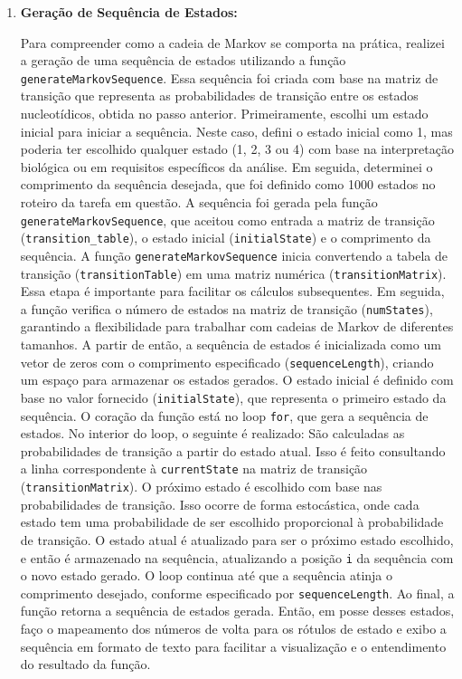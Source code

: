 \documentclass{article}
\begin{document}
\begin{enumerate}
    \item \textbf{Geração de Sequência de Estados:}
    
    Para compreender como a cadeia de Markov se comporta na prática, realizei a geração de uma sequência de estados utilizando a função \texttt{generateMarkovSequence}. Essa sequência foi criada com base na matriz de transição que representa as probabilidades de transição entre os estados nucleotídicos, obtida no passo anterior. Primeiramente, escolhi um estado inicial para iniciar a sequência. Neste caso, defini o estado inicial como 1, mas poderia ter escolhido qualquer estado (1, 2, 3 ou 4) com base na interpretação biológica ou em requisitos específicos da análise. Em seguida, determinei o comprimento da sequência desejada, que foi definido como 1000 estados no roteiro da tarefa em questão. A sequência foi gerada pela função \texttt{generateMarkovSequence}, que aceitou como entrada a matriz de transição (\texttt{transition\_table}), o estado inicial (\texttt{initialState}) e o comprimento da sequência. A função \texttt{generateMarkovSequence} inicia convertendo a tabela de transição (\texttt{transitionTable}) em uma matriz numérica (\texttt{transitionMatrix}). Essa etapa é importante para facilitar os cálculos subsequentes. Em seguida, a função verifica o número de estados na matriz de transição (\texttt{numStates}), garantindo a flexibilidade para trabalhar com cadeias de Markov de diferentes tamanhos. A partir de então, a sequência de estados é inicializada como um vetor de zeros com o comprimento especificado (\texttt{sequenceLength}), criando um espaço para armazenar os estados gerados. O estado inicial é definido com base no valor fornecido (\texttt{initialState}), que representa o primeiro estado da sequência. O coração da função está no loop \texttt{for}, que gera a sequência de estados. No interior do loop, o seguinte é realizado: São calculadas as probabilidades de transição a partir do estado atual. Isso é feito consultando a linha correspondente à \texttt{currentState} na matriz de transição (\texttt{transitionMatrix}). O próximo estado é escolhido com base nas probabilidades de transição. Isso ocorre de forma estocástica, onde cada estado tem uma probabilidade de ser escolhido proporcional à probabilidade de transição. O estado atual é atualizado para ser o próximo estado escolhido, e então é armazenado na sequência, atualizando a posição \texttt{i} da sequência com o novo estado gerado. O loop continua até que a sequência atinja o comprimento desejado, conforme especificado por \texttt{sequenceLength}. Ao final, a função retorna a sequência de estados gerada. Então, em posse desses estados, faço o mapeamento dos números de volta para os rótulos de estado e exibo a sequência em formato de texto  para facilitar a visualização e o entendimento do resultado da função.


\end{enumerate}
\end{document}
